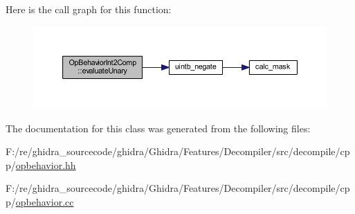 Here is the call graph for this function\+:
\nopagebreak
\begin{figure}[H]
\begin{center}
\leavevmode
\includegraphics[width=350pt]{class_op_behavior_int2_comp_aae6f3ee2de9b13a268e8c56b00788655_cgraph}
\end{center}
\end{figure}


The documentation for this class was generated from the following files\+:\begin{DoxyCompactItemize}
\item 
F\+:/re/ghidra\+\_\+sourcecode/ghidra/\+Ghidra/\+Features/\+Decompiler/src/decompile/cpp/\mbox{\hyperlink{opbehavior_8hh}{opbehavior.\+hh}}\item 
F\+:/re/ghidra\+\_\+sourcecode/ghidra/\+Ghidra/\+Features/\+Decompiler/src/decompile/cpp/\mbox{\hyperlink{opbehavior_8cc}{opbehavior.\+cc}}\end{DoxyCompactItemize}
